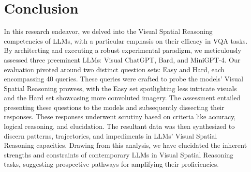 \documentclass[journal,10pt]{IEEEtran}
\begin{document}
\section{Conclusion}
In this research endeavor, we delved into the Visual Spatial Reasoning competencies of LLMs, with a particular emphasis on their efficacy in VQA tasks. By architecting and executing a robust experimental paradigm, we meticulously assessed three preeminent LLMs: Visual ChatGPT, Bard, and MiniGPT-4. Our evaluation pivoted around two distinct question sets: Easy and Hard, each encompassing 40 queries. These queries were crafted to probe the models' Visual Spatial Reasoning prowess, with the Easy set spotlighting less intricate visuals and the Hard set showcasing more convoluted imagery. The assessment entailed presenting these questions to the models and subsequently dissecting their responses. These responses underwent scrutiny based on criteria like accuracy, logical reasoning, and elucidation. The resultant data was then synthesized to discern patterns, trajectories, and impediments in LLMs' Visual Spatial Reasoning capacities. Drawing from this analysis, we have elucidated the inherent strengths and constraints of contemporary LLMs in Visual Spatial Reasoning tasks, suggesting prospective pathways for amplifying their proficiencies.



\appendices

\label{Chart}
\clearpage

\label{Easy}

\label{Hard}
\end{document}
